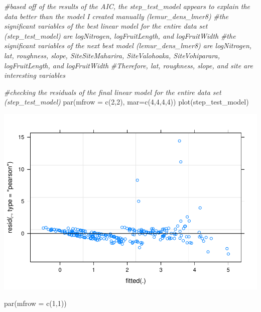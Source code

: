 \documentclass[
  12pt,
]{article}
\newenvironment{Shaded}{\begin{snugshade}}{\end{snugshade}}
\newcommand{\AttributeTok}[1]{\textcolor[rgb]{0.77,0.63,0.00}{#1}}
\newcommand{\CommentTok}[1]{\textcolor[rgb]{0.56,0.35,0.01}{\textit{#1}}}
\newcommand{\DecValTok}[1]{\textcolor[rgb]{0.00,0.00,0.81}{#1}}
\newcommand{\FunctionTok}[1]{\textcolor[rgb]{0.00,0.00,0.00}{#1}}
\newcommand{\NormalTok}[1]{#1}
\begin{document}
\begin{Shaded}
\begin{Highlighting}[]
\CommentTok{\#based off of the results of the AIC, the step\_test\_model appears to explain the data better than the model I created manually (lemur\_dens\_lmer8)}
\CommentTok{\#the significant variables of the best linear model for the entire data set (step\_test\_model) are logNitrogen, logFruitLength, and logFruitWidth}
\CommentTok{\#the significant variables of the next best model (lemur\_dens\_lmer8) are logNitrogen, lat, roughness, slope, SiteSiteMaharira, SiteValohoaka, SiteVohiparara, logFruitLength, and logFruitWidth}
\CommentTok{\#Therefore, lat, roughness, slope, and site are interesting variables}

\CommentTok{\#checking the residuals of the final linear model for the entire data set (step\_test\_model)}
\FunctionTok{par}\NormalTok{(}\AttributeTok{mfrow =} \FunctionTok{c}\NormalTok{(}\DecValTok{2}\NormalTok{,}\DecValTok{2}\NormalTok{), }\AttributeTok{mar=}\FunctionTok{c}\NormalTok{(}\DecValTok{4}\NormalTok{,}\DecValTok{4}\NormalTok{,}\DecValTok{4}\NormalTok{,}\DecValTok{4}\NormalTok{))}
\FunctionTok{plot}\NormalTok{(step\_test\_model)}
\end{Highlighting}
\end{Shaded}

\includegraphics{project_draft_files/figure-latex/unnamed-chunk-6-1.pdf}

\begin{Shaded}
\begin{Highlighting}[]
\FunctionTok{par}\NormalTok{(}\AttributeTok{mfrow =} \FunctionTok{c}\NormalTok{(}\DecValTok{1}\NormalTok{,}\DecValTok{1}\NormalTok{))}
\end{Highlighting}
\end{Shaded}
\end{document}
